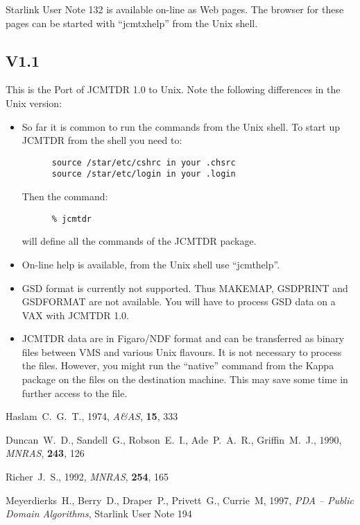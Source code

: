 \documentclass[twoside,11pt]{article}
\newcommand{\xref}[3]{#1}
\renewcommand{\_}{\texttt{\symbol{95}}}
\begin{document}
 Starlink User Note 132 is available on-line as Web pages. The browser
 for these pages can be started with ``jcmt\_xhelp'' from the Unix shell.


\subsection*{V1.1}

This is the Port of JCMTDR 1.0 to Unix. Note the following differences
in the Unix version:

\begin{itemize}
\item So far it is common to run the commands from the Unix shell. To start
   up JCMTDR from the shell you need to:

\begin{verbatim}
      source /star/etc/cshrc in your .chsrc
      source /star/etc/login in your .login
\end{verbatim}
   Then the command:
\begin{verbatim}
      % jcmtdr
\end{verbatim}
   will define all the commands of the JCMTDR package.

\item On-line help is available, from the Unix shell use ``jcmt\_help''.

\item GSD format is currently not supported. Thus MAKEMAP, GSD\_PRINT and
   GSD\_FORMAT are not available. You will have to process GSD data on a
   VAX with JCMTDR 1.0.

\item JCMTDR data are in Figaro/NDF format and can be transferred as binary
   files between VMS and various Unix flavours. It is not necessary to
   process the files. However, you might run the ``native'' command from
   the Kappa package on the files on the destination machine. This may
   save some time in further access to the file.
\end{itemize}


\begin{thebibliography}{}

Haslam~C.~G.~T., 1974, \textit{A\&AS}, \textbf{15}, 333

Duncan~W.~D., Sandell~G., Robson~E.~I., Ade~P.~A.~R., Griffin~M.~J.,
1990, \textit{MNRAS}, \textbf{243}, 126

Richer~J.~S., 1992, \textit{MNRAS}, \textbf{254}, 165

Meyerdierks~H., Berry~D., Draper~P., Privett~G., Currie~M,
1997, \textit{ PDA -- Public Domain Algorithms},
\xref{Starlink User Note 194}{sun194}{}

\end{thebibliography}
\end{document}
